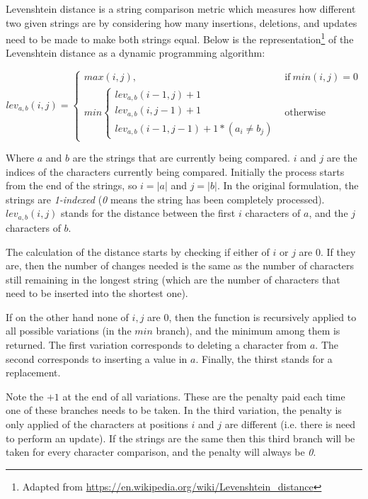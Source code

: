\documentclass[epsfig,a4paper,11pt,titlepage,twoside,openany]{book}
\begin{document}
Levenshtein distance \cite{levenshtein1966binary} is a string comparison metric which measures how different two given strings are by considering how many insertions, deletions, and updates need to be made to make both strings equal. Below is the representation\footnote{Adapted from \url{https://en.wikipedia.org/wiki/Levenshtein_distance}} of the Levenshtein distance as a dynamic programming algorithm:

\begin{equation*}
  lev_{a,b}(i,j) =
  \begin{cases}
    max(i, j), & \text{if}\ min(i,j) = 0  \\
    min   
    \begin{cases}
        lev_{a,b}(i-1,j) + 1  \\
        lev_{a,b}(i,j-1) + 1  \\
        lev_{a,b}(i-1,j-1) + 1 * (a_i \neq b_j)  
    \end{cases} & \text{otherwise}
  \end{cases}
\end{equation*}

Where $a$ and $b$ are the strings that are currently being compared. $i$ and $j$ are the indices of the characters currently being compared. Initially the process starts from the end of the strings, so $i = |a|$ and $j=|b|$. In the original formulation, the strings are \textit{1-indexed} (\textit{0} means the string has been completely processed). $lev_{a,b}(i,j)$ stands for the distance between the first $i$ characters of $a$, and the $j$ characters of $b$. 

The calculation of the distance starts by checking if either of $i$ or $j$ are 0. If they are, then the number of changes needed is the same as the number of characters still remaining in the longest string (which are the number of characters that need to be inserted into the shortest one). 

If on the other hand none of $i,j$ are 0, then the function is recursively applied to all possible variations (in the $min$ branch), and the minimum among them is returned. The first variation corresponds to deleting a character from $a$. The second corresponds to inserting a value in $a$. Finally, the thirst stands for a replacement.

Note the $+1$ at the end of all variations. These are the penalty paid each time one of these branches needs to be taken. In the third variation, the penalty is only applied of the characters at positions $i$ and $j$ are different (i.e. there is need to perform an update). If the strings are the same then this third branch will be taken for every character comparison, and the penalty will always be \textit{0}.
\end{document}

